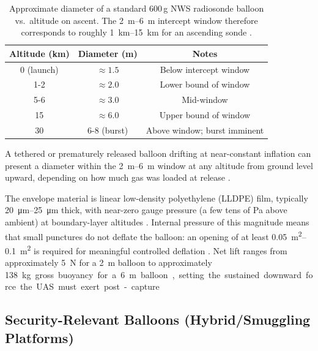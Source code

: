 \begin{table}[h]
\centering
\caption{Approximate diameter of a standard 600\,g NWS radiosonde balloon vs.\ altitude on ascent. The \SIrange{2}{6}{\metre} intercept window therefore corresponds to roughly \SIrange{1}{15}{\kilo\metre} for an ascending sonde \cite{WorldMeteorologicalOrganization2018GuideGuide}.}
\label{tab:radiosonde_expansion}
\begin{tabular}{@{}ccc@{}}
\toprule
\textbf{Altitude (km)} & \textbf{Diameter (m)} & \textbf{Notes} \\
\midrule
0 (launch)   & $\approx 1.5$ & Below intercept window \\
1-2         & $\approx 2.0$ & Lower bound of window \\
5-6         & $\approx 3.0$ & Mid-window \\
15     & $\approx 6.0$ & Upper bound of window \\
30     & 6-8 (burst)  & Above window; burst imminent \\
\bottomrule
\end{tabular}
\end{table}
 
A tethered or prematurely released balloon drifting at near-constant
inflation can present a diameter within the \SIrange{2}{6}{\metre} window at any altitude from ground level upward, depending on how much gas was loaded at release \cite{Yajima2009ScientificApplications}.

The envelope material is linear low-density polyethylene (LLDPE) film, typically \SIrange{20}{25}{\micro\metre} thick, with near-zero gauge pressure (a few tens of Pa above ambient) at boundary-layer
altitudes \cite{SuneelKumar2008MechanicalBalloons}. Internal pressure of this magnitude means that small punctures do not deflate the balloon: an opening of at least \SIrange{0.05}{0.1}{\metre\squared} is required for meaningful controlled deflation \cite{Yajima2009ScientificApplications}. Net lift ranges from approximately \SI{5}{\newton} for a \SI{2}{\metre} balloon to approximately \SI{138}kg gross buoyancy for a \SI{6}{\metre} balloon, setting the sustained downward force the UAS must exert post-capture.
 
\vspace{-10pt}

\subsection{Security-Relevant Balloons (Hybrid/Smuggling Platforms)}
\label{subsec:security_balloons}
 
